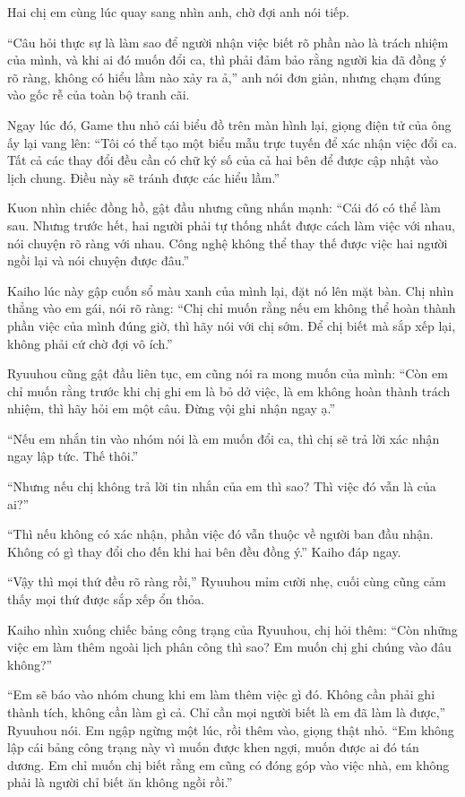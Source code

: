 \documentclass[../main.tex]{subfiles}
\begin{document}
Hai chị em cùng lúc quay sang nhìn anh, chờ đợi anh nói tiếp.

``Câu hỏi thực sự là làm sao để người nhận việc biết rõ phần nào là trách nhiệm của mình, và khi ai đó muốn đổi ca, thì phải đảm bảo rằng người kia đã đồng ý rõ ràng, không có hiểu lầm nào xảy ra ả,'' anh nói đơn giản, nhưng chạm đúng vào gốc rễ của toàn bộ tranh cãi.

Ngay lúc đó, Game thu nhỏ cái biểu đồ trên màn hình lại, giọng điện tử của ông ấy lại vang lên: ``Tôi có thể tạo một biểu mẫu trực tuyến để xác nhận việc đổi ca. Tất cả các thay đổi đều cần có chữ ký số của cả hai bên để được cập nhật vào lịch chung. Điều này sẽ tránh được các hiểu lầm.''

Kuon nhìn chiếc đồng hồ, gật đầu nhưng cũng nhấn mạnh: ``Cái đó có thể làm sau. Nhưng trước hết, hai người phải tự thống nhất được cách làm việc với nhau, nói chuyện rõ ràng với nhau. Công nghệ không thể thay thế được việc hai người ngồi lại và nói chuyện được đâu.''

Kaiho lúc này gập cuốn sổ màu xanh của mình lại, đặt nó lên mặt bàn. Chị nhìn thẳng vào em gái, nói rõ ràng: ``Chị chỉ muốn rằng nếu em không thể hoàn thành phần việc của mình đúng giờ, thì hãy nói với chị sớm. Để chị biết mà sắp xếp lại, không phải cứ chờ đợi vô ích.''

Ryuuhou cũng gật đầu liên tục, em cũng nói ra mong muốn của mình: ``Còn em chỉ muốn rằng trước khi chị ghi em là bỏ dở việc, là em không hoàn thành trách nhiệm, thì hãy hỏi em một câu. Đừng vội ghi nhận ngay ạ.''

``Nếu em nhắn tin vào nhóm nói là em muốn đổi ca, thì chị sẽ trả lời xác nhận ngay lập tức. Thế thôi.''

``Nhưng nếu chị không trả lời tin nhắn của em thì sao? Thì việc đó vẫn là của ai?''

``Thì nếu không có xác nhận, phần việc đó vẫn thuộc về người ban đầu nhận. Không có gì thay đổi cho đến khi hai bên đều đồng ý.'' Kaiho đáp ngay.

``Vậy thì mọi thứ đều rõ ràng rồi,'' Ryuuhou mỉm cười nhẹ, cuối cùng cũng cảm thấy mọi thứ được sắp xếp ổn thỏa.

Kaiho nhìn xuống chiếc bảng công trạng của Ryuuhou, chị hỏi thêm: ``Còn những việc em làm thêm ngoài lịch phân công thì sao? Em muốn chị ghi chúng vào đâu không?''

``Em sẽ báo vào nhóm chung khi em làm thêm việc gì đó. Không cần phải ghi thành tích, không cần làm gì cả. Chỉ cần mọi người biết là em đã làm là được,'' Ryuuhou nói. Em ngập ngừng một lúc, rồi thêm vào, giọng thật nhỏ. ``Em không lập cái bảng công trạng này vì muốn được khen ngợi, muốn được ai đó tán dương. Em chỉ muốn chị biết rằng em cũng có đóng góp vào việc nhà, em không phải là người chỉ biết ăn không ngồi rồi.''
\end{document}

